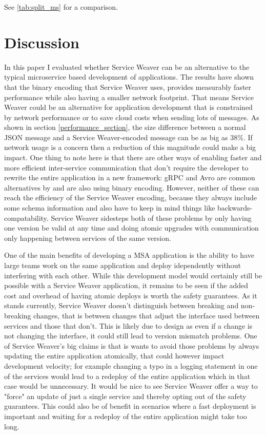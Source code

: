 \documentclass[sigconf,review,9pt]{acmart}
\begin{document}
See \ref{tab:split_ms} for a comparison.

\section{Discussion}

In this paper I evaluated whether Service Weaver can be an alternative to the typical
microservice based development of applications.
The results have shown that the binary encoding that Service Weaver uses, provides
measurably faster performance while also having a smaller network footprint.
That means Service Weaver could be an alternative for application development
that is constrained by network performance or to save cloud costs when sending lots
of messages.
As shown in section \ref{performance_section}, the size difference between a normal
JSON message and a Service Weaver-encoded message can be as big as 38\%.
If network usage is a concern then a reduction of this magnitude could make a
big impact.
One thing to note here is that there are other ways of enabling faster and more efficient
inter-service communication that don't require the developer to rewrite the entire application
in a new framework: gRPC \cite{GRPC} and Avro \cite{ApacheAvro} are common alternatives
by and are also using binary encoding.
However, neither of these can reach the efficiency of the Service Weaver encoding,
because they always include some schema information and also have to keep in mind
things like backwards-compatability.
Service Weaver sidesteps both of these problems by only having one version be valid
at any time and doing atomic upgrades with communication only happening between services
of the same version.


One of the main benefits of developing a MSA application is the ability to
have large teams work on the same application and deploy idependently without
interfering with each other. \cite{what}
While this development model would certainly still be possible with a Service Weaver
application, it remains to be seen if the added cost and overhead of having atomic
deploys is worth the safety guarantees.
As it stands currently, Service Weaver doesn't distinguish between breaking and
non-breaking changes, that is between changes that adjust the interface used between
services and those that don't.
This is likely due to design as even if a change is not changing the interface, it
could still lead to version mismatch problems.
One of Service Weaver's big claims is that is wants to avoid those problems by always
updating the entire application atomically, that could however impact development velocity;
for example changing a typo in a logging statement in one of the services would
lead to a redeploy of the entire application which in that case would be unnecessary.
It would be nice to see Service Weaver offer a way to "force" an update of just a single
service and thereby opting out of the safety guarantees.
This could also be of benefit in scenarios where a fast deployment is important and
waiting for a redeploy of the entire application might take too long.
\end{document}
